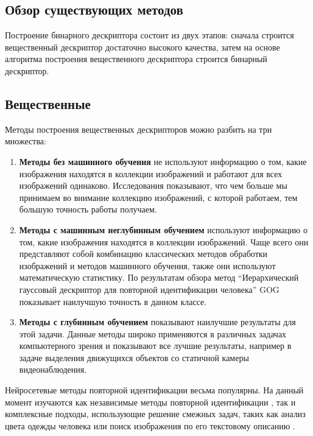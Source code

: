\documentclass[a4paper]{article}
\begin{document}
\begin{multicols*}{2}
\section{Обзор существующих методов}

Построение бинарного дескриптора состоит из двух этапов: сначала строится вещественный дескриптор достаточно высокого качества, затем на основе алгоритма построения вещественного дескриптора строится бинарный дескриптор.

\subsection{Вещественные}

Методы построения вещественных дескрипторов можно разбить на три множества:

\begin{enumerate}
    \item \textbf{Методы без машинного обучения} не используют информацию о том, какие изображения находятся в коллекции изображений и работают для всех изображений одинаково. Исследования\cite{review1}\cite{review2} показывают, что чем больше мы принимаем во внимание коллекцию изображений, с которой работаем, тем большую точность работы получаем.
    
    \item \textbf{Методы с машинным неглубинным обучением} используют информацию о том, какие изображения находятся в коллекции изображений. Чаще всего они представляют собой комбинацию классических методов обработки изображений и методов машинного обучения, также они используют математическую статистику. По результатам обзора\cite{review1} метод “Иерархический гауссовый дескриптор для повторной идентификации человека” GOG\cite{gog} показывает наилучшую точность в данном классе.
    
    \item \textbf{Методы с глубинным обучением} показывают наилучшие результаты для этой задачи\cite{resnet}\cite{dml}. Данные методы широко применяются в различных задачах компьютерного зрения и показывают все лучшие результаты, например в задаче выделения движущихся объектов со статичной камеры видеонаблюдения\cite{backgroundsubstraction}.
    
\end{enumerate}

Нейросетевые методы повторной идентификации весьма популярны. На данный момент изучаются как независимые методы повторной идентификации \cite{cnn4reid}, так и комплексные подходы, использующие решение смежных задач, таких как анализ цвета одежды человека \cite{closes} или поиск изображения по его текстовому описанию \cite{findtext}.


\end{multicols*}
\end{document}
